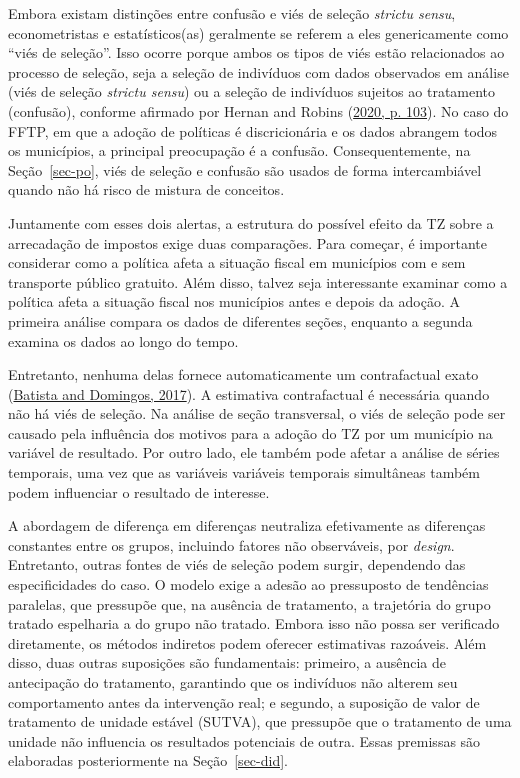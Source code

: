 \documentclass[12pt, a4paper, twoside]{article}
\numberwithin{equation}{subsection} %
\begin{document}
Embora existam distinções entre confusão e viés de seleção
\textit{strictu sensu}, econometristas e estatísticos(as) geralmente se
referem a eles genericamente como ``viés de seleção''. Isso ocorre
porque ambos os tipos de viés estão relacionados ao processo de seleção,
seja a seleção de indivíduos com dados observados em análise (viés de
seleção \textit{strictu sensu}) ou a seleção de indivíduos sujeitos ao
tratamento (confusão), conforme afirmado por Hernan and Robins
(\protect\hyperlink{ref-Hernan2020}{2020, p. 103}). No caso do FFTP, em
que a adoção de políticas é discricionária e os dados abrangem todos os
municípios, a principal preocupação é a confusão. Consequentemente, na
Seção~\ref{sec-po}, viés de seleção e confusão são usados de forma
intercambiável quando não há risco de mistura de conceitos.

Juntamente com esses dois alertas, a estrutura do possível efeito da TZ
sobre a arrecadação de impostos exige duas comparações. Para começar, é
importante considerar como a política afeta a situação fiscal em
municípios com e sem transporte público gratuito. Além disso, talvez
seja interessante examinar como a política afeta a situação fiscal nos
municípios antes e depois da adoção. A primeira análise compara os dados
de diferentes seções, enquanto a segunda examina os dados ao longo do
tempo.

Entretanto, nenhuma delas fornece automaticamente um contrafactual exato
(\protect\hyperlink{ref-batista_domingos_2017}{Batista and Domingos,
2017}). A estimativa contrafactual é necessária quando não há viés de
seleção. Na análise de seção transversal, o viés de seleção pode ser
causado pela influência dos motivos para a adoção do TZ por um município
na variável de resultado. Por outro lado, ele também pode afetar a
análise de séries temporais, uma vez que as variáveis variáveis
temporais simultâneas também podem influenciar o resultado de interesse.

A abordagem de diferença em diferenças neutraliza efetivamente as
diferenças constantes entre os grupos, incluindo fatores não
observáveis, por \textit{design}. Entretanto, outras fontes de viés de
seleção podem surgir, dependendo das especificidades do caso. O modelo
exige a adesão ao pressuposto de tendências paralelas, que pressupõe
que, na ausência de tratamento, a trajetória do grupo tratado espelharia
a do grupo não tratado. Embora isso não possa ser verificado
diretamente, os métodos indiretos podem oferecer estimativas razoáveis.
Além disso, duas outras suposições são fundamentais: primeiro, a
ausência de antecipação do tratamento, garantindo que os indivíduos não
alterem seu comportamento antes da intervenção real; e segundo, a
suposição de valor de tratamento de unidade estável (SUTVA), que
pressupõe que o tratamento de uma unidade não influencia os resultados
potenciais de outra. Essas premissas são elaboradas posteriormente na
Seção~\ref{sec-did}.
\end{document}
